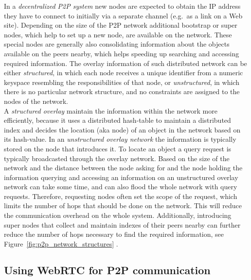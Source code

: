 In a \emph{decentralized \gls{P2P} system} new nodes are expected to obtain the \gls{IP} address they have to connect to initially via a separate channel (e.g.\ as a link on a Web site). Depending on the size of the \gls{P2P} network additional bootstrap or super nodes, which help to set up a new node, are available on the network. These special nodes are generally also consolidating information about the objects available on the peers nearby, which helps speeding up searching and accessing required information. The overlay information of such distributed network can be either \emph{structured}, in which each node receives a unique identifier from a numeric keyspace resembling the responsibilities of that node, or \emph{unstructured}, in which there is no particular network structure, and no constraints are assigned to the nodes of the network. \\

A \emph{structured overlay} maintain the information within the network more efficiently, because it uses a distributed hash-table to maintain a distributed index and decides the location (aka node) of an object in the network based on its hash-value. In an \emph{unstructured overlay network} the information is typically stored on the node that introduces it. To locate an object a query request is typically broadcasted through the overlay network. Based on the size of the network and the distance between the node asking for and the node holding the information querying and accessing an information on an unstructured overlay network can take some time, and can also flood the whole network with query requests. Therefore, requesting nodes often set the scope of the request, which limits the number of hops that should be done on the network. This will reduce the communication overhead on the whole system. Additionally, introducing super nodes that collect and maintain indexes of their peers nearby can further reduce the number of hops necessary to find the required information, see Figure~\ref{fig:p2p_network_structures} \citep{rodrigues2010peer}. \@


\subsection{Using \gls{WebRTC} for \gls{P2P} communication}
\label{sec:p2p_webrtc}

